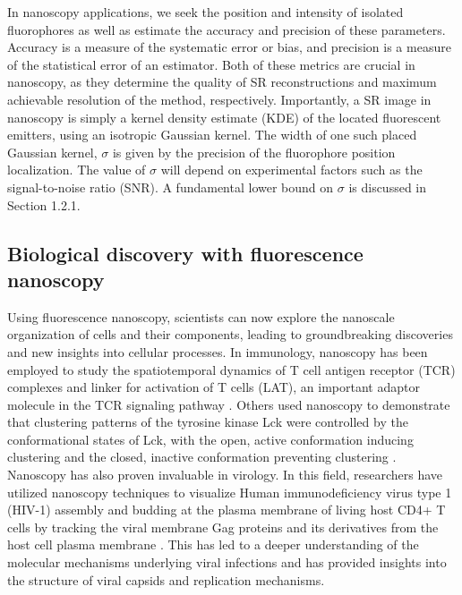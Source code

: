 In nanoscopy applications, we seek the position and intensity of isolated fluorophores as well as estimate the accuracy and precision of these parameters. Accuracy is a measure of the systematic error or bias, and precision is a measure of the statistical error of an estimator. Both of these metrics are crucial in nanoscopy, as they determine the quality of SR reconstructions and maximum achievable resolution of the method, respectively. Importantly, a SR image in nanoscopy is simply a kernel density estimate (KDE) of the located fluorescent emitters, using an isotropic Gaussian kernel. The width of one such placed Gaussian kernel, $\sigma$ is given by the precision of the fluorophore position localization. The value of $\sigma$ will depend on experimental factors such as the signal-to-noise ratio (SNR). A fundamental lower bound on $\sigma$ is discussed in Section 1.2.1.

\subsection{Biological discovery with fluorescence nanoscopy}

Using fluorescence nanoscopy, scientists can now explore the nanoscale organization of cells and their components, leading to groundbreaking discoveries and new insights into cellular processes. In immunology, nanoscopy has been employed to study the spatiotemporal dynamics of T cell antigen receptor (TCR) complexes and linker for activation of T cells (LAT), an important adaptor molecule in the TCR signaling pathway \parencite{Lillemeier2010}. Others used nanoscopy to demonstrate that clustering patterns of the tyrosine kinase Lck were controlled by the conformational states of Lck, with the open, active conformation inducing clustering and the closed, inactive conformation preventing clustering \parencite{Rossy2013}. Nanoscopy has also proven invaluable in virology. In this field, researchers have utilized nanoscopy techniques to visualize Human immunodeficiency virus type 1 (HIV-1) assembly and budding at the plasma membrane of living host CD4+ T cells by tracking the viral membrane Gag proteins and its derivatives from the host cell plasma membrane \parencite{Floderer2018}. This has led to a deeper understanding of the molecular mechanisms underlying viral infections and has provided insights into the structure of viral capsids and replication mechanisms.

